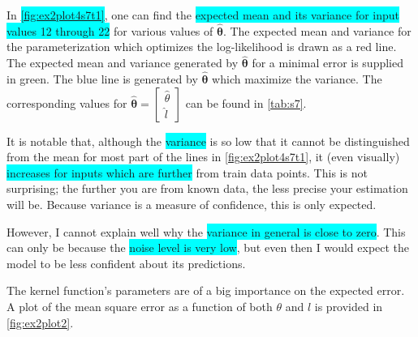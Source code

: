 \documentclass[a4paper,11pt]{article}
\newcommand{\V}[1]{\ensuremath{\boldsymbol{#1}}}
\newcommand{\hl}[1]{\colorbox{cyan}{#1}}
\begin{document}
In \hl{\autoref{fig:ex2plot4s7t1}}, one can find the \hl{expected mean and its variance for input values 12 through 22} for various values of $\V{\hat\theta}$.  The expected mean and variance for the parameterization which optimizes the log-likelihood is drawn as a red line.  The expected mean and variance generated by $\V{\hat\theta}$ for a minimal error is supplied in green.  The blue line is generated by $\V{\hat\theta}$ which maximize the variance.  The corresponding values for $\V{\hat\theta} = \begin{bmatrix}\hat\theta \\\hat l\end{bmatrix}$ can be found in \autoref{tab:s7}.

It is notable that, although the \hl{variance} is so low that it cannot be distinguished from the mean for most part of the lines in \autoref{fig:ex2plot4s7t1}, it (even visually) \hl{increases for inputs which are further} from train data points.  This is not surprising; the further you are from known data, the less precise your estimation will be.  Because variance is a measure of confidence, this is only expected.

However, I cannot explain well why the \hl{variance in general is close to zero}.  This can only be because the \hl{noise level is very low}, but even then I would expect the model to be less confident about its predictions. 

The kernel function's parameters are of a big importance on the expected error.  A plot of the mean square error as a function of both $\theta$ and $l$ is provided in \autoref{fig:ex2plot2}. 

\end{document}
